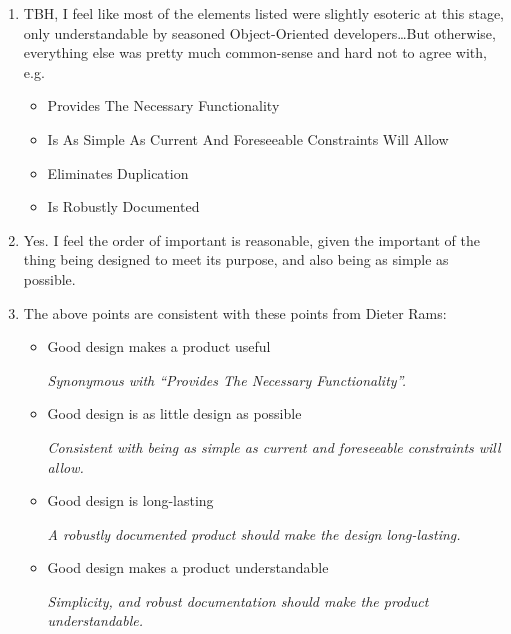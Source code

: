 \documentclass[11pt,oneside]{article}
\def\mybibliostyle{plain}
\def\mybibliocommand{}
\begin{document}
\begin{enumerate}

\item TBH, I feel like most of the elements listed were slightly esoteric at this stage, only understandable by seasoned Object-Oriented developers\ldots But otherwise, everything else was pretty much common-sense and hard not to agree with, e.g.
\begin{itemize}

\item Provides The Necessary Functionality
\item Is As Simple As Current And Foreseeable Constraints Will Allow
\item Eliminates Duplication
\item Is Robustly Documented
\end{itemize}


\item Yes. I feel the order of important is reasonable, given the important of the thing being designed to meet its purpose, and also being as simple as possible.
\item The above points are consistent with these points from Dieter Rams:

\begin{itemize}

\item Good design makes a product useful

{\itshape Synonymous with ``Provides The Necessary Functionality''.}


\item Good design is as little design as possible

{\itshape Consistent with being as simple as current and foreseeable constraints will allow.}


\item Good design is long-lasting

{\itshape A robustly documented product should make the design long-lasting.}


\item Good design makes a product understandable

{\itshape Simplicity, and robust documentation should make the product understandable.}


\end{itemize}


\end{enumerate}


\mybibliocommand
\end{document}
